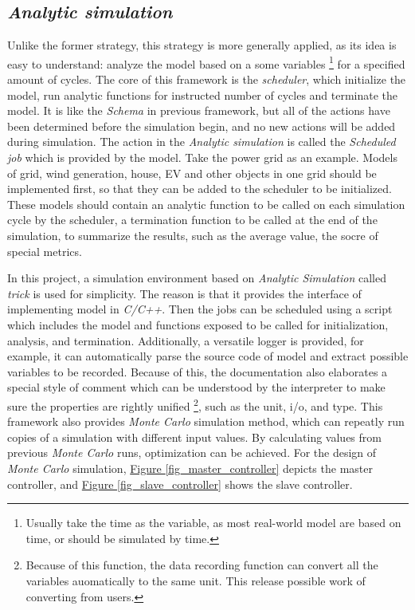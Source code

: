 \documentclass[12pt,a4paper]{report}
\begin{document}
        \subsection{\emph{Analytic simulation}}
        \label{text_nasa_trick}
        Unlike the former strategy, this strategy is more generally applied, as its idea is easy to understand: analyze the model based on a some variables \footnote{Usually take the time as the variable, as most real-world model are based on time, or should be simulated by time.} for a specified amount of cycles. The core of this framework is the \emph{scheduler}, which initialize the model, run analytic functions for instructed number of cycles and terminate the model. It is like the \emph{Schema} in previous framework, but all of the actions have been determined before the simulation begin, and no new actions will be added during simulation. The action in the \emph{Analytic simulation} is called the \emph{Scheduled job} which is provided by the model.
        Take the power grid as an example. Models of grid, wind generation, house, EV and other objects in one grid should be implemented first, so that they can be added to the scheduler to be initialized. These models should contain an analytic function to be called on each simulation cycle by the scheduler, a termination function to be called at the end of the simulation, to summarize the results, such as the average value, the socre of special metrics.

        In this project, a simulation environment based on \emph{Analytic Simulation} called \emph{trick} \cite{website:trick} is used for simplicity. The reason is that it provides the interface of implementing model in \emph{C/C++}. Then the jobs can be scheduled using a script which includes the model and functions exposed to be called for initialization, analysis, and termination. Additionally, a versatile logger is provided, for example, it can automatically parse the source code of model and extract possible variables to be recorded. Because of this, the documentation also elaborates a special style of comment which can be understood by the interpreter to make sure the properties are rightly unified \footnote{Because of this function, the data recording function can convert all the variables auomatically to the same unit. This release possible work of converting from users.}, such as the unit, i/o, and type. This framework also provides \emph{Monte Carlo} simulation method, which can repeatly run copies of a simulation with different input values. By calculating values from previous \emph{Monte Carlo} runs, optimization can be achieved.
        For the design of \emph{Monte Carlo} simulation, \hyperref[fig_master_controller]{Figure \ref*{fig_master_controller}} depicts the master controller, and \hyperref[fig_slave_controller]{Figure \ref*{fig_slave_controller}} shows the slave controller.
\end{document}
